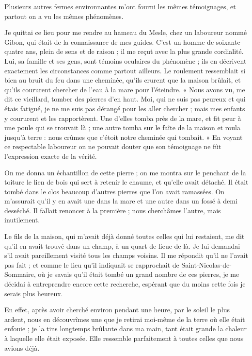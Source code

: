 \documentclass[a4paper, 11pt, oneside, polutonikogreek, french]{article}
\begin{document}
Plusieurs autres fermes environnantes m'ont fourni les mêmes témoignages, et partout on a vu les mêmes phénomènes.

Je quittai ce lieu pour me rendre au hameau du Mesle, chez un laboureur nommé Gibon, qui était de la connaissance de mes guides. C'est un homme de soixante-quatre ans, plein de sens et de raison ; il me reçut avec la plus grande cordialité. Lui, sa famille et ses gens, sont témoins oculaires du phénomène ; ils en décrivent exactement les circonstances comme partout ailleurs. Le roulement ressemblait si bien au bruit du feu dans une cheminée, qu'ils crurent que la maison brûlait, et qu'ils coururent chercher de l'eau à la mare pour l'éteindre. « Nous avons vu, me dit ce vieillard, tomber des pierres d'en haut. Moi, qui ne suis pas peureux et qui étais fatigué, je ne me suis pas dérangé pour les aller chercher ; mais mes enfants y coururent et les rapportèrent. Une d'elles tomba près de la mare, et fit peur à une poule qui se trouvait là ; une autre tomba sur le faîte de la maison et roula jusqu'à terre : nous crûmes que c'étoit notre cheminée qui tombait. » En voyant ce respectable laboureur on ne pouvait douter que son témoignage ne fût l'expression exacte de la vérité.

On me donna un échantillon de cette pierre ; on me montra sur le penchant de la toiture le lien de bois qui sert à retenir le chaume, et qu'elle avait détaché. Il était tombé dans le clos beaucoup d'autres pierres que l'on avait ramassées. On m'assurait qu'il y en avait une dans la mare et une autre dans un fossé à demi desséché. Il fallait renoncer à la première ; nous cherchâmes l'autre, mais inutilement.

Le fils de la maison, qui m'avait déjà donné toutes celles qui lui restaient, me dit qu'il en avait trouvé dans un champ, à un quart de lieue de là. Je lui demandai s'il avait pareillement visité tous les champs voisins. Il me répondit qu'il ne l'avait pas fait ; et comme le lieu qu'il indiquait se rapprochait de Saint-Nicolas-de-Sommaire, où je savais qu'il était tombé un grand nombre de ces pierres, je me décidai à entreprendre encore cette recherche, espérant que du moins cette fois je serais plus heureux.

En effet, après avoir cherché environ pendant une heure, par le soleil le plus ardent, nous en découvrîmes une que je retirai moi-même de la terre où elle était enfouie ; je la tins longtemps brûlante dans ma main, tant était grande la chaleur à laquelle elle était exposée. Elle ressemble parfaitement à toutes celles que nous avions déjà.
\end{document}
